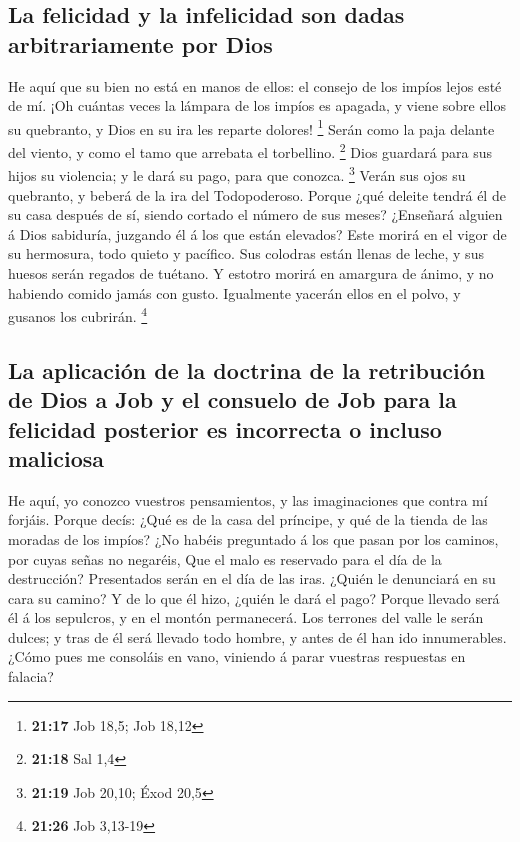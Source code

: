 \hypertarget{la-felicidad-y-la-infelicidad-son-dadas-arbitrariamente-por-dios}{%
\subsection{La felicidad y la infelicidad son dadas arbitrariamente por
Dios}\label{la-felicidad-y-la-infelicidad-son-dadas-arbitrariamente-por-dios}}

 He aquí que su bien no está en manos de ellos: el
consejo de los impíos lejos esté de mí.  ¡Oh cuántas
veces la lámpara de los impíos es apagada, y viene sobre ellos su
quebranto, y Dios en su ira les reparte dolores! \footnote{\textbf{21:17}
  Job 18,5; Job 18,12}  Serán como la paja delante del
viento, y como el tamo que arrebata el torbellino. \footnote{\textbf{21:18}
  Sal 1,4}  Dios guardará para sus hijos su violencia; y
le dará su pago, para que conozca. \footnote{\textbf{21:19} Job 20,10;
  Éxod 20,5}  Verán sus ojos su quebranto, y beberá de la
ira del Todopoderoso.  Porque ¿qué deleite tendrá él de
su casa después de sí, siendo cortado el número de sus meses?
 ¿Enseñará alguien á Dios sabiduría, juzgando él á los
que están elevados?  Este morirá en el vigor de su
hermosura, todo quieto y pacífico.  Sus colodras están
llenas de leche, y sus huesos serán regados de tuétano. 
Y estotro morirá en amargura de ánimo, y no habiendo comido jamás con
gusto.  Igualmente yacerán ellos en el polvo, y gusanos
los cubrirán. \footnote{\textbf{21:26} Job 3,13-19}

\hypertarget{la-aplicaciuxf3n-de-la-doctrina-de-la-retribuciuxf3n-de-dios-a-job-y-el-consuelo-de-job-para-la-felicidad-posterior-es-incorrecta-o-incluso-maliciosa}{%
\subsection{La aplicación de la doctrina de la retribución de Dios a Job
y el consuelo de Job para la felicidad posterior es incorrecta o incluso
maliciosa}\label{la-aplicaciuxf3n-de-la-doctrina-de-la-retribuciuxf3n-de-dios-a-job-y-el-consuelo-de-job-para-la-felicidad-posterior-es-incorrecta-o-incluso-maliciosa}}

 He aquí, yo conozco vuestros pensamientos, y las
imaginaciones que contra mí forjáis.  Porque decís: ¿Qué
es de la casa del príncipe, y qué de la tienda de las moradas de los
impíos?  ¿No habéis preguntado á los que pasan por los
caminos, por cuyas señas no negaréis,  Que el malo es
reservado para el día de la destrucción? Presentados serán en el día de
las iras.  ¿Quién le denunciará en su cara su camino? Y
de lo que él hizo, ¿quién le dará el pago?  Porque
llevado será él á los sepulcros, y en el montón permanecerá.
 Los terrones del valle le serán dulces; y tras de él
será llevado todo hombre, y antes de él han ido innumerables.
 ¿Cómo pues me consoláis en vano, viniendo á parar
vuestras respuestas en falacia?

